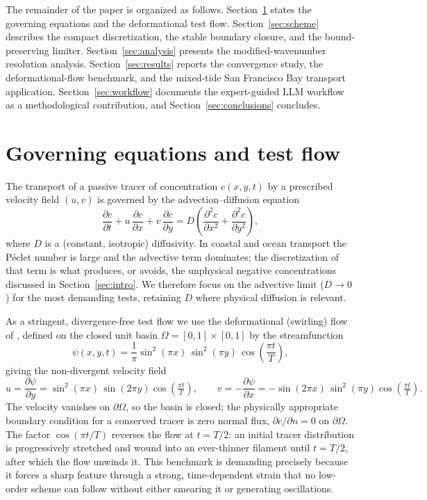 \documentclass[Journal]{ascelike}   %
\begin{document}
The remainder of the paper is organized as follows. Section~\ref{sec:gov}
states the governing equations and the deformational test flow.
Section~\ref{sec:scheme} describes the compact discretization, the stable
boundary closure, and the bound-preserving limiter. Section~\ref{sec:analysis}
presents the modified-wavenumber resolution analysis. Section~\ref{sec:results}
reports the convergence study, the deformational-flow benchmark, and the
mixed-tide San Francisco Bay transport application. Section~\ref{sec:workflow}
documents the expert-guided LLM workflow as a methodological contribution, and
Section~\ref{sec:conclusions} concludes.

\section{Governing equations and test flow}
\label{sec:gov}

The transport of a passive tracer of concentration $c(x,y,t)$ by a prescribed
velocity field $(u,v)$ is governed by the advection--diffusion equation
\begin{equation}
\frac{\partial c}{\partial t} + u\,\frac{\partial c}{\partial x}
+ v\,\frac{\partial c}{\partial y}
= D\!\left(\frac{\partial^2 c}{\partial x^2}+\frac{\partial^2 c}{\partial y^2}\right),
\label{eq:adv-diff}
\end{equation}
where $D$ is a (constant, isotropic) diffusivity. In coastal and ocean transport
the P\'eclet number is large and the advective term dominates; the discretization
of that term is what produces, or avoids, the unphysical negative concentrations
discussed in Section~\ref{sec:intro}. We therefore focus on the advective limit
($D\to 0$) for the most demanding tests, retaining $D$ where physical diffusion is
relevant.

As a stringent, divergence-free test flow we use the deformational (swirling) flow
of \citet{leveque1996}, defined on the closed unit basin
$\Omega=[0,1]\times[0,1]$ by the streamfunction
\begin{equation}
\psi(x,y,t)=\frac{1}{\pi}\sin^2(\pi x)\,\sin^2(\pi y)\,\cos\!\left(\frac{\pi t}{T}\right),
\label{eq:streamfn}
\end{equation}
giving the non-divergent velocity field
\begin{equation}
u=\frac{\partial\psi}{\partial y}=\sin^2(\pi x)\,\sin(2\pi y)\cos\!\left(\tfrac{\pi t}{T}\right),
\qquad
v=-\frac{\partial\psi}{\partial x}=-\sin(2\pi x)\,\sin^2(\pi y)\cos\!\left(\tfrac{\pi t}{T}\right).
\label{eq:velocity}
\end{equation}
The velocity vanishes on $\partial\Omega$, so the basin is closed; the physically
appropriate boundary condition for a conserved tracer is zero normal flux,
$\partial c/\partial n=0$ on $\partial\Omega$. The factor $\cos(\pi t/T)$ reverses
the flow at $t=T/2$: an initial tracer distribution is progressively stretched and
wound into an ever-thinner filament until $t=T/2$, after which the flow unwinds it.
This benchmark is demanding precisely because it forces a sharp feature through a
strong, time-dependent strain that no low-order scheme can follow without either
smearing it or generating oscillations.
\end{document}
